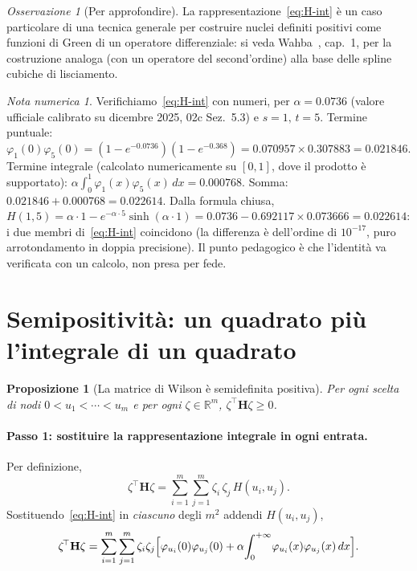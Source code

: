 \documentclass[11pt,a4paper]{article}
\theoremstyle{plain}
\newtheorem{proposizione}[teorema]{Proposizione}
\theoremstyle{definition}
\theoremstyle{remark}
\newtheorem*{osservazione}{Osservazione}
\newtheorem*{attenzione}{Nota numerica}
\newcommand{\Hmat}{\mathbf{H}}
\newcommand{\transp}{^{\!\top}}
\begin{document}
\begin{osservazione}[Per approfondire]
La rappresentazione~\eqref{eq:H-int} è un caso particolare di una tecnica generale per
costruire nuclei definiti positivi come funzioni di Green di un operatore differenziale: si
veda Wahba~\cite{wahba1990}, cap.~1, per la costruzione analoga (con un operatore del
second'ordine) alla base delle spline cubiche di lisciamento.
\end{osservazione}

\begin{attenzione}
Verifichiamo~\eqref{eq:H-int} con numeri, per $\alpha=0.0736$ (valore ufficiale calibrato su
dicembre 2025, 02c Sez.~5.3) e $s=1,\,t=5$. Termine puntuale:
$\varphi_1(0)\varphi_5(0) = (1-e^{-0.0736})(1-e^{-0.368}) = 0.070957\times 0.307883 = 0.021846$.
Termine integrale (calcolato numericamente su $[0,1]$, dove il prodotto è supportato):
$\alpha\int_0^{1}\varphi_1(x)\varphi_5(x)\,dx = 0.000768$. Somma: $0.021846+0.000768=0.022614$.
Dalla formula chiusa, $H(1,5)=\alpha\cdot 1 - e^{-\alpha\cdot 5}\sinh(\alpha\cdot 1)
= 0.0736 - 0.692117\times 0.073666 = 0.022614$: i due membri di~\eqref{eq:H-int} coincidono
(la differenza è dell'ordine di $10^{-17}$, puro arrotondamento in doppia precisione). Il
punto pedagogico è che l'identità va verificata con un calcolo, non presa per fede.
\end{attenzione}

\section{Semipositività: un quadrato più l'integrale di un quadrato}
\label{sec:semipositivita}

\begin{proposizione}[La matrice di Wilson è semidefinita positiva]
\label{prop:H-spd}
Per ogni scelta di nodi $0<u_1<\cdots<u_m$ e per ogni $\zeta\in\mathbb{R}^m$,
$\zeta\transp\Hmat\zeta\ge 0$.
\end{proposizione}

\paragraph{Passo 1: sostituire la rappresentazione integrale in ogni entrata.} Per definizione,
\[
  \zeta\transp\Hmat\zeta = \sum_{i=1}^m\sum_{j=1}^m \zeta_i\,\zeta_j\,H(u_i,u_j).
\]
Sostituendo~\eqref{eq:H-int} in \emph{ciascuno} degli $m^2$ addendi $H(u_i,u_j)$,
\[
  \zeta\transp\Hmat\zeta
  = \sum_{i=1}^m\sum_{j=1}^m \zeta_i\zeta_j
    \Bigl[\varphi_{u_i}(0)\varphi_{u_j}(0) + \alpha\!\int_0^{+\infty}\!\varphi_{u_i}(x)\varphi_{u_j}(x)\,dx\Bigr] .
\]
\end{document}
